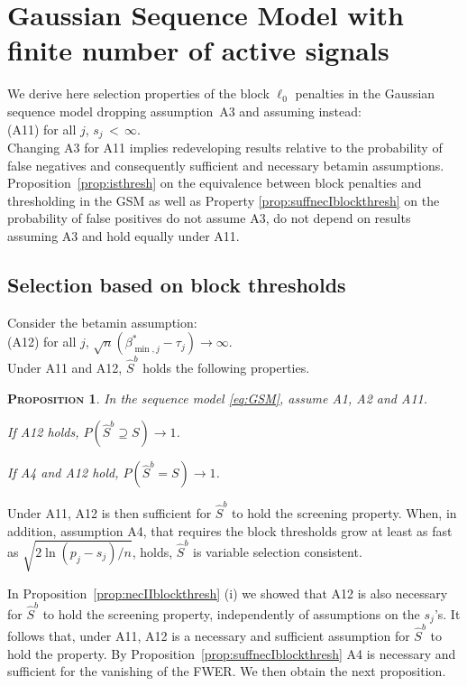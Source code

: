 \documentclass[aos]{imsart}
\theoremstyle{plain}
\newtheorem{prop}[thm]{\textsc{Proposition}}
\begin{document}
\section{Gaussian Sequence Model with finite number of active signals}\label{sec:appendixGSMsfinite}

We derive here selection properties of the block $\ell_0$ penalties in the Gaussian sequence model dropping assumption~A3 and assuming instead:\\[5pt]
(A11) \quad for all $j$, \;$s_j \,< \, \infty$.\\[5pt]
Changing A3 for A11 implies redeveloping results relative to the probability of false negatives and consequently sufficient and necessary betamin assumptions. Proposition~\ref{prop:isthresh} on the equivalence between block penalties and thresholding in the GSM as well as Property \ref{prop:suffnecIblockthresh} on the probability of false positives do not assume A3, do not depend on results assuming A3 and hold equally under A11.

\subsection{Selection based on block thresholds}

Consider the betamin assumption:\\[5pt]
(A12) \quad for all $j$, \; $\sqrt{n}(\beta_{\min,j}^*-\tau_j) \to \infty$.\\[5pt]
Under A11 and A12, $\hat S^b$ holds the following properties.
\begin{prop}\label{prop:suffnecIIblockthreshbis}
 In the sequence model \eqref{eq:GSM}, assume A1, A2 and A11.
 \begin{longlist}
  \item If A12 holds, $P(\hat{S}^{b}\supseteq S ) \to 1$.
  \item If A4 and A12 hold,  $P(\hat{S}^{b}=S  ) \to 1$.
 \end{longlist}
\end{prop}
Under A11, A12 is then sufficient for $\hat{S}^{b}$ to hold the screening property. When, in addition, assumption A4, that requires the block thresholds grow at least as fast as $\sqrt{2\ln(p_j-s_j)/n}$, holds, $\hat{S}^{b}$ is variable selection consistent.

In Proposition~\ref{prop:necIIblockthresh} (i) we showed that A12 is also necessary for $\hat{S}^{b}$ to hold the screening property, independently of assumptions on the $s_j$'s. It follows that, under A11, A12 is a necessary and sufficient assumption for $\hat{S}^{b}$ to hold the property. By Proposition~\ref{prop:suffnecIblockthresh} A4 is necessary and sufficient for the vanishing of the FWER. We then obtain the next proposition.
\end{document}
